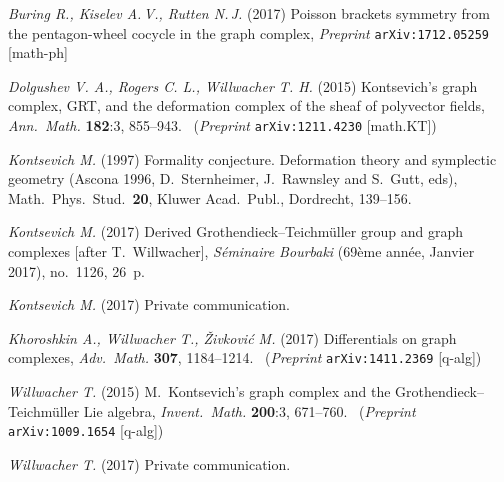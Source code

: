 \documentclass[a4paper]{jpconf}%
\theoremstyle{definition}
\theoremstyle{remark}
\newcommand{\by}[1]{\textit{{#1}}}
\newcommand{\jour}[1]{\textit{{#1}}}
\newcommand{\vol}[1]{\textbf{{#1}}}
\newcommand{\book}[1]{\textrm{{#1}}}
\begin{document}
\begin{thebibliography}{10}
\by{Buring R., Kiselev A.\,V., Rutten N.\,J.} (2017)
Poisson brackets symmetry from the pentagon\/-\/wheel cocycle in the graph complex,
\jour{Preprint} \texttt{arXiv:1712.05259} [math-ph]

\by{Dolgushev V. A., Rogers C. L., Willwacher T. H.} (2015) Kontsevich's graph complex, GRT, and the deformation complex of the sheaf of polyvector fields,
\jour{Ann.\ Math.} \vol{182}:3, 855--943.\ %
(\jour{Preprint} \texttt{arXiv:1211.4230} [math.KT])

\by{Kontsevich M.} (1997)
Formality conjecture. 
\book{Deformation theory and symplectic geometry} (Ascona %
1996, D.\,%
Sternheimer, J.\,%
Rawnsley and S.\,%
Gutt, eds), 
Math.\ Phys.\ Stud.~\vol{20}, Kluwer Acad.\ Publ., Dordrecht, 139--156.

\by{Kontsevich M.} (2017) Derived Grothendieck\/--\/Teichm\"uller group and graph complexes [after T.~Will\-wa\-cher], \jour{S\'eminaire Bourbaki} (69\`eme ann\'ee, Janvier 2017), no.~1126, 26~p.

\by{Kontsevich M.} (2017) Private communication.%

\by{Khoroshkin A., Willwacher T., \v{Z}ivkovi\'c M.} (2017) Differentials on graph complexes, \jour{Adv.\ Math.} \vol{307}, 1184--1214.\ %
(\jour{Preprint} \texttt{arXiv:1411.2369} [q-alg])

\by{Willwacher T.} (2015) M.~Kontsevich's graph complex and the Grothendieck\/--\/Teichm\"uller Lie algebra,
\jour{Invent.\ Math.} \vol{200}:3, 671--760.\ %
(\jour{Preprint} \texttt{arXiv:1009.1654} [q-alg]) %

\by{Willwacher T.} (2017) Private communication.%


\end{thebibliography}
\end{document}
